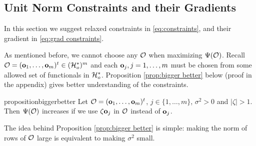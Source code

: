 \subsection{Unit Norm Constraints and their Gradients}\label{subsec:unit norm}
In this section we suggest relaxed constraints in
\eqref{eq:constraints}, and their gradient in \eqref{eq:grad
  constraints}.

As mentioned before, we cannot choose any $\mathcal{O}$ when maximizing
$\Psi(\mathcal{O})$. Recall $\mathcal{O} = (\mathbf{o}_1,\dots,\mathbf{o}_m)^t \in
(\mathcal{H}_o^*)^m$ and each $\mathbf{o}_j,j=1,\dots,m$ must be chosen from some
allowed set of functionals in $\mathcal{H}_o^*$. %
Proposition \ref{prop:bigger better} below (proof in the appendix)
gives better understanding of the constraints.
\begin{restatable*}{proposition}{biggerbetter}\label{prop:bigger better}
  Let $\mathcal{O} = (\mathbf{o}_1,\dots,\mathbf{o}_m)^t$, $j \in \{1,\dots,m\}$,
  $\sigma^2 > 0$ and $|\zeta| > 1$. Then $\Psi(\mathcal{O})$ increases if we
  use $\zeta \mathbf{o}_j$ in $\mathcal{O}$ instead of $\mathbf{o}_j$.
\end{restatable*}
The idea behind Proposition \ref{prop:bigger better} is simple: making
the norm of rows of $\mathcal{O}$ large is equivalent to making $\sigma^2$
small. %


